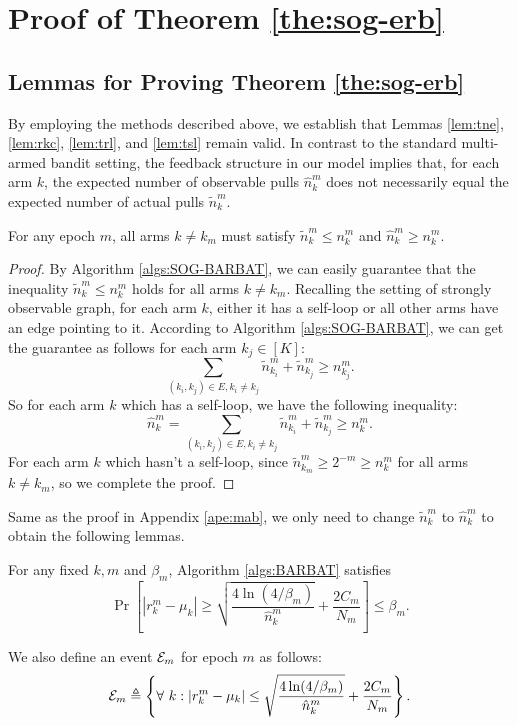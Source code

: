 \section{Proof of Theorem \ref{the:sog-erb}}
\label{ape:sog}

\subsection{Lemmas for Proving Theorem \ref{the:sog-erb}}

By employing the methods described above, we establish that Lemmas \ref{lem:tne}, \ref{lem:rkc}, \ref{lem:trl}, and \ref{lem:tsl} remain valid. In contrast to the standard multi-armed bandit setting, the feedback structure in our model implies that, for each arm $k$, the expected number of observable pulls $\hat{n}_k^m$ does not necessarily equal the expected number of actual pulls $\widetilde{n}_k^m$.


\begin{lemma}
\label{lem:ocnosg}
    For any epoch $m$, all arms $k \neq k_m$ must satisfy $\widetilde{n}_k^m \leq n_k^m$ and $\hat{n}_k^m \geq n_k^m$.
\end{lemma}
\begin{proof}
    By Algorithm \ref{algs:SOG-BARBAT}, we can easily guarantee that the inequality $\widetilde{n}_k^m \leq n_k^m$ holds for all arms $k \neq k_m$.
    Recalling the setting of strongly observable graph, for each arm $k$, either it has a self-loop or all other arms have an edge pointing to it. According to Algorithm \ref{algs:SOG-BARBAT}, we can get the guarantee as follows for each arm $k_j \in [K]$:
    \[\sum_{(k_i,k_j) \in E, k_i \neq k_j} \widetilde{n}_{k_i}^m + \widetilde{n}_{k_j}^m \geq n_{k_j}^m.\]
    So for each arm $k$ which has a self-loop, we have the following inequality:
    \[\hat{n}_k^m = \sum_{(k_i,k_j) \in E, k_i \neq k_j} \widetilde{n}_{k_i}^m + \widetilde{n}_{k_j}^m \geq n_k^m.\]
    For each arm $k$ which hasn't a self-loop, since $\widetilde{n}_{k_m}^m \geq 2^{-m} \geq n_{k}^m$ for all arms $k \neq k_m$, so we complete the proof.
\end{proof}
Same as the proof in Appendix \ref{ape:mab}, we only need to change $\widetilde{n}_k^m$ to $\hat{n}_k^m$ to obtain the following lemmas.

\begin{lemma}
\label{lem:bersog} %
    For any fixed $k, m$ and $\beta_m$, Algorithm \ref{algs:BARBAT} satisfies
    \[\Pr\left[|r_k^m - \mu_k| \geq \sqrt{\frac{4\ln(4 / \beta_m)}{\hat{n}_k^m}} + \frac{2C_m}{N_m}\right] \leq \beta_m.\]
\end{lemma}
We also define an event ${\mathcal{E}}_m$ for epoch $m$ as follows:
\begin{equation*}
    {\mathcal{E}}_m \triangleq \left\{ \forall\ k: |r_k^m - \mu_k| \leq \sqrt{\frac{4\ln(4 /\beta_m)}{\hat{n}_k^m}} + \frac{2C_m}{N_m} \right\}.
\end{equation*}

